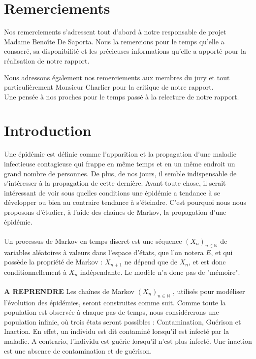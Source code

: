 \documentclass[12pt,a4paper]{report}
\theoremstyle{remark}
\begin{document}
\section*{Remerciements}
Nos remerciements s'adressent tout d'abord à notre responsable de projet Madame Benoîte De Saporta. Nous la remercions pour le temps qu'elle a consacré, sa disponibilité et les précieuses informations qu'elle a apporté pour la réalisation de notre rapport. 

Nous adressons également nos remerciements aux membres du jury et tout particulièrement Monsieur Charlier pour la critique de notre rapport. 
\\
Une pensée à nos proches pour le temps passé à la relecture de notre rapport.


\newpage
\tableofcontents
\newpage
\section*{Introduction}
\vspace{1cm}
Une épidémie est définie comme l'apparition et la propagation d'une maladie infectieuse contagieuse qui frappe en même temps et en un même endroit un grand nombre de personnes. De plus, de nos jours, il semble indispensable de s'intéresser à la propagation de cette dernière. Avant toute chose, il serait intéressant de voir sous quelles conditions une épidémie a tendance à se développer ou bien au contraire tendance à s'éteindre. C'est pourquoi nous nous proposons d'étudier, à l'aide des chaînes de Markov, la propagation d'une épidémie.
\\
\\
Un processus de Markov en temps discret est une séquence $(X_n)_{n\in\mathbb{N}}$ de variables aléatoires à valeurs dans l'espace d'états, que l'on notera $E$, et qui possède la propriété de Markov : $X_{n+1}$ ne dépend que de $X_n$, et est donc conditionnellement à $X_n$ indépendante. Le modèle n'a donc pas de "mémoire".
\\
\\
\textbf{A REPRENDRE}
Les chaînes de Markov $(X_n)_{n \in \mathbb{N}}$ , utilisés pour modéliser l'évolution des épidémies, seront construites comme suit. Comme toute la population est observée à chaque pas de temps, nous considérerons une population infinie, où trois états seront possibles : Contamination, Guérison et Inaction. En effet, un individu est dit contaminé lorsqu'il est infecté par la maladie. A contrario, l'individu est guérie lorsqu'il n'est plus infecté. Une inaction est une absence de contamination et de guérison. 
\end{document}
